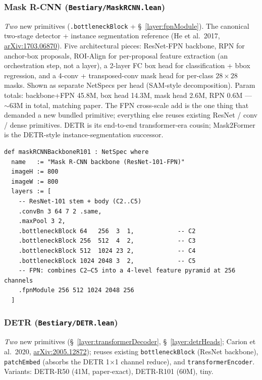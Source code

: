 \subsubsection*{Mask R-CNN (\texttt{Bestiary/MaskRCNN.lean})}
\emph{Two} new primitives (\texttt{.bottleneckBlock} + \S~\ref{layer:fpnModule}). The canonical two-stage detector +
instance segmentation reference (He et al.\ 2017,
\href{https://arxiv.org/abs/1703.06870}{arXiv:1703.06870}). Five architectural
pieces: ResNet-FPN backbone, RPN for anchor-box proposals, ROI-Align
for per-proposal feature extraction (an orchestration step, not a
layer), a 2-layer FC box head for classification + bbox regression,
and a 4-conv + transposed-conv mask head for per-class $28 \times
28$ masks. Shown as separate NetSpecs per head (SAM-style
decomposition). Param totals: backbone+FPN 45.8M, box head 14.3M,
mask head 2.6M, RPN 0.6M --- $\sim$63M in total, matching paper. The
FPN cross-scale add is the one thing that demanded a new bundled
primitive; everything else reuses existing ResNet / conv / dense
primitives. DETR is its end-to-end transformer-era cousin; Mask2Former
is the DETR-style instance-segmentation successor.

\begin{verbatim}
def maskRCNNBackboneR101 : NetSpec where
  name   := "Mask R-CNN backbone (ResNet-101-FPN)"
  imageH := 800
  imageW := 800
  layers := [
    -- ResNet-101 stem + body (C2..C5)
    .convBn 3 64 7 2 .same,
    .maxPool 3 2,
    .bottleneckBlock 64   256  3  1,            -- C2
    .bottleneckBlock 256  512  4  2,            -- C3
    .bottleneckBlock 512  1024 23 2,            -- C4
    .bottleneckBlock 1024 2048 3  2,            -- C5
    -- FPN: combines C2–C5 into a 4-level feature pyramid at 256 channels
    .fpnModule 256 512 1024 2048 256
  ]
\end{verbatim}

\subsubsection*{DETR (\texttt{Bestiary/DETR.lean})}
\emph{Two} new primitives (\S~\ref{layer:transformerDecoder},
\S~\ref{layer:detrHeads}; Carion et al.\ 2020,
\href{https://arxiv.org/abs/2005.12872}{arXiv:2005.12872}); reuses
existing \texttt{bottleneckBlock} (ResNet backbone),
\texttt{patchEmbed} (absorbs the DETR 1$\times$1 channel reduce), and
\texttt{transformerEncoder}. Variants: DETR-R50 (41M, paper-exact),
DETR-R101 (60M), tiny.

